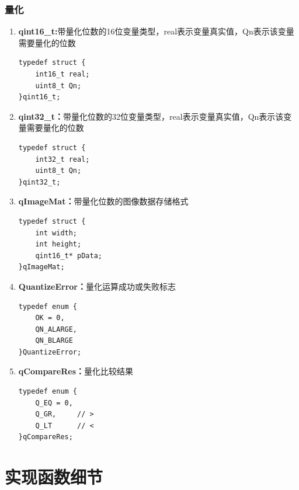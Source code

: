 \documentclass[12pt, a4paper, oneside]{ctexbook}
\begin{document}
		\subsection{量化}
		\begin{enumerate}
			\item \textbf{qint16\_t:}带量化位数的16位变量类型，real表示变量真实值，Qn表示该变量需要量化的位数
				\begin{lstlisting}
typedef struct {
	int16_t real;		
	uint8_t Qn;			
}qint16_t;					
				\end{lstlisting}
			\item \textbf{qint32\_t：}带量化位数的32位变量类型，real表示变量真实值，Qn表示该变量需要量化的位数
				\begin{lstlisting}
typedef struct {
	int32_t real;	
	uint8_t Qn;		
}qint32_t;				
			\end{lstlisting}
			\item \textbf{qImageMat：}带量化位数的图像数据存储格式
				\begin{lstlisting}
typedef struct {
	int width;
	int height;
	qint16_t* pData;
}qImageMat;			
			\end{lstlisting}
			\item \textbf{QuantizeError：}量化运算成功或失败标志
				\begin{lstlisting}
typedef enum {
	OK = 0,
	QN_ALARGE,
	QN_BLARGE
}QuantizeError;		
			\end{lstlisting}
			\item \textbf{qCompareRes：}量化比较结果
				\begin{lstlisting}
typedef enum {
	Q_EQ = 0,	
	Q_GR,     // >
	Q_LT      // <
}qCompareRes;		
				\end{lstlisting}
			
		\end{enumerate}

	
	
	
	
	
	\chapter{实现函数细节}	
\end{document}
